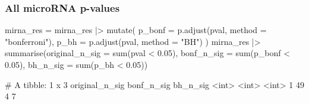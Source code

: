\documentclass[a4paper]{article}
\begin{document}
\subsubsection{All microRNA p-values}
\begin{Schunk}
\begin{Sinput}
mirna_res = mirna_res |> 
  mutate(
    p_bonf = p.adjust(pval, method = "bonferroni"),
    p_bh = p.adjust(pval, method = "BH")
  )
mirna_res |> 
  summarise(original_n_sig = sum(pval < 0.05),
            bonf_n_sig = sum(p_bonf < 0.05),
            bh_n_sig = sum(p_bh < 0.05))
\end{Sinput}
\begin{Soutput}
# A tibble: 1 x 3
  original_n_sig bonf_n_sig bh_n_sig
           <int>      <int>    <int>
1             49          4        7
\end{Soutput}
\end{Schunk}
\end{document}
